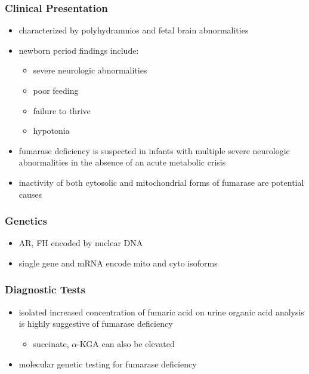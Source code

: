 \documentclass[12pt]{scrartcl}
\begin{document}
\subsubsection{Clinical Presentation}
\label{sec:org95bc06e}
\begin{itemize}
\item characterized by polyhydramnios and fetal brain abnormalities
\item newborn period findings include:
\begin{itemize}
\item severe neurologic abnormalities
\item poor feeding
\item failure to thrive
\item hypotonia
\end{itemize}
\item fumarase deficiency is suspected in infants with multiple severe
neurologic abnormalities in the absence of an acute metabolic crisis
\item inactivity of both cytosolic and mitochondrial forms of fumarase are
potential causes
\end{itemize}
\subsubsection{Genetics}
\label{sec:orgea013fa}
\begin{itemize}
\item AR, FH encoded by nuclear DNA
\item single gene and mRNA encode mito and cyto isoforms
\end{itemize}
\subsubsection{Diagnostic Tests}
\label{sec:org1cac9c7}
\begin{itemize}
\item isolated increased concentration of fumaric acid on urine organic
acid analysis is highly suggestive of fumarase deficiency
\begin{itemize}
\item succinate, \(\alpha\)-KGA can also be elevated
\end{itemize}
\item molecular genetic testing for fumarase deficiency
\end{itemize}
\end{document}
